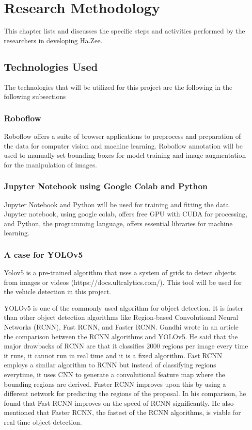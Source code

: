 \chapter{Research Methodology}
This chapter lists and discusses the specific steps and activities performed by the researchers in developing Ha.Zee.

\section{Technologies Used}
The technologies that will be utilized for this project are the following in the following subsections

\subsection{Roboflow}
Roboflow offers a suite  of browser applications to preprocess and preparation of the data for computer vision and machine learning. Roboflow annotation will be used  to manually set bounding boxes for model training and image augmentation for the manipulation of images. \cite{roboflow}

\subsection{Jupyter Notebook using Google Colab and Python}
Jupyter Notebook and Python will be used for training and fitting the data. Jupyter notebook, using google colab,  offers free GPU with CUDA for processing, and Python, the programming language, offers essential libraries for machine learning. \cite{googlecolab}

\subsection{A case  for YOLOv5}
Yolov5 is a pre-trained algorithm that uses a system of grids to detect objects from images or videos (https://docs.ultralytics.com/). This tool will be used for the vehicle detection in this project. 

	YOLOv5 is one of the commonly used algorithm for object detection. It is faster than other object detection algorithms like Region-based Convolutional Neural Networks (RCNN), Fast RCNN, and Faster RCNN. Gandhi \citeyear{gandhi_2018} wrote in an article the comparison between the RCNN algorithms and YOLOv5. He said that the major drawbacks of RCNN are that it classifies 2000 regions per image every time it runs, it cannot run in real time and it is a fixed algorithm. Fast RCNN employs a similar algorithm to RCNN but instead of classifying regions everytime, it uses CNN to generate a convolutional feature map where the bounding regions are derived. Faster RCNN improves upon this by using a different network for predicting the regions of the proposal. In his comparison, he found that Fast RCNN improves on the speed of RCNN significantly. He also mentioned that Faster RCNN, the fastest of the RCNN algorithms, is viable for real-time object detection. 

